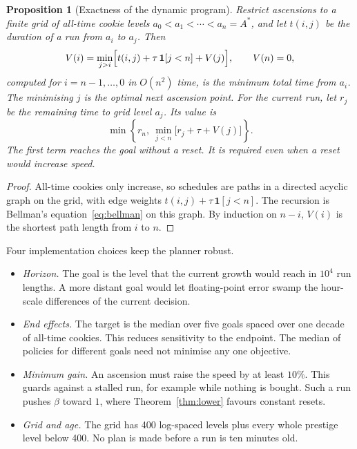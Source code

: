 \documentclass[11pt,a4paper]{article}
\numberwithin{equation}{section}
\newtheorem{proposition}[theorem]{Proposition}
\theoremstyle{definition}
\theoremstyle{remark}
\begin{document}
\begin{proposition}[Exactness of the dynamic program]\label{prop:dp}
Restrict ascensions to a finite grid of all-time cookie levels $a_0<a_1<\cdots<a_n=A^\ast$, and let $t(i,j)$ be the duration of a run from $a_i$ to $a_j$. Then
\begin{equation}\label{eq:dp}
 V(i)=\min_{j>i}\Bigl[t(i,j)+\tau\,\mathbf 1[j<n]+V(j)\Bigr],\qquad V(n)=0,
\end{equation}
computed for $i=n-1,\ldots,0$ in $O(n^2)$ time, is the minimum total time from $a_i$. The minimising $j$ is the optimal next ascension point. For the current run, let $r_j$ be the remaining time to grid level $a_j$. Its value is
\[
 \min\left\{r_n,\ \min_{j<n}\bigl[r_j+\tau+V(j)\bigr]\right\}.
\]
The first term reaches the goal without a reset. It is required even when a reset would increase speed.
\end{proposition}

\begin{proof}
All-time cookies only increase, so schedules are paths in a directed acyclic graph on the grid, with edge weights $t(i,j)+\tau\,\mathbf 1[j<n]$. The recursion is Bellman's equation~\eqref{eq:bellman} on this graph. By induction on $n-i$, $V(i)$ is the shortest path length from $i$ to $n$.
\end{proof}

Four implementation choices keep the planner robust.
\begin{itemize}
\item \emph{Horizon.} The goal is the level that the current growth would reach in $10^4$ run lengths. A more distant goal would let floating-point error swamp the hour-scale differences of the current decision.
\item \emph{End effects.} The target is the median over five goals spaced over one decade of all-time cookies. This reduces sensitivity to the endpoint. The median of policies for different goals need not minimise any one objective.
\item \emph{Minimum gain.} An ascension must raise the speed by at least $10\%$. This guards against a stalled run, for example while nothing is bought. Such a run pushes $\beta$ toward $1$, where Theorem~\ref{thm:lower} favours constant resets.
\item \emph{Grid and age.} The grid has 400 log-spaced levels plus every whole prestige level below 400. No plan is made before a run is ten minutes old.
\end{itemize}
\end{document}
